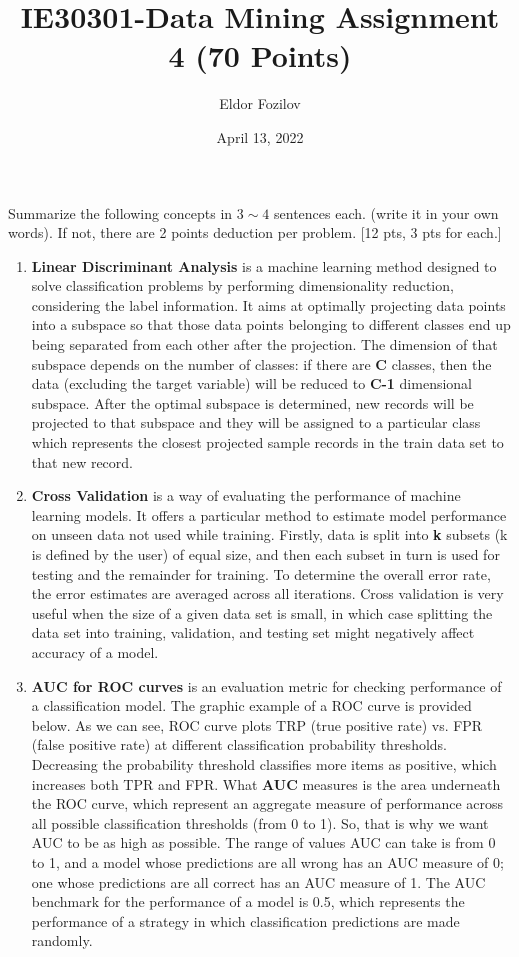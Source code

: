 \documentclass{homework}
\title{IE30301-Data Mining Assignment 4 (70 Points)}
\author{Eldor Fozilov}
\date{April 13, 2022}
\begin{document}
    \maketitle
    \exercise*
    Summarize the following concepts in $3\sim4$ sentences each. (write it in your own words). If not, there are 2 points deduction per problem. [12 pts, 3 pts for each.]  \\
    \begin{enumerate}
        \item \textbf{Linear Discriminant Analysis} is a machine learning method designed to solve classification problems by performing dimensionality reduction, considering the label information. It aims at optimally projecting data points into a subspace so that those data points belonging to different classes end up being separated from each other after the projection. The dimension of that subspace depends on the number of classes: if there are \textbf{C} classes, then the data (excluding the target variable) will be reduced to \textbf{C-1} dimensional subspace. After the optimal subspace is determined, new records will be projected to that subspace and they will be assigned to a particular class which represents the closest projected sample records in the train data set to that new record.  
        
        \item \textbf{Cross Validation} is a way of evaluating the performance of machine learning models. It offers a particular method to estimate model performance on unseen data not used while training. Firstly, data is split into \textbf{k} subsets (k is defined by the user) of equal size, and then each subset in turn is used for testing and the remainder for training. To determine the overall error rate, the error estimates are averaged across all iterations. Cross validation is very useful when the size of a given data set is small, in which case splitting the data set into training, validation, and testing set might negatively affect accuracy of a model.
        
        \item \textbf{AUC for ROC curves} is an evaluation metric for checking performance of a classification model. The graphic example of a ROC curve is provided below. As we can see, ROC curve plots TRP (true positive rate) vs. FPR (false positive rate) at different classification probability thresholds. Decreasing the probability threshold classifies more items as positive, which increases both TPR and FPR. What \textbf{AUC} measures is the area underneath the ROC curve, which represent an aggregate measure of performance across all possible classification thresholds (from 0 to 1). So, that is why we want AUC to be as high as possible. The range of values AUC can take is from 0 to 1, and a model whose predictions are all wrong has an AUC measure of 0; one whose predictions are all correct has an AUC measure of 1. The AUC benchmark for the performance of a model is 0.5, which represents the performance of a strategy in which classification predictions are made randomly.
        

\end{enumerate}
\end{document}
